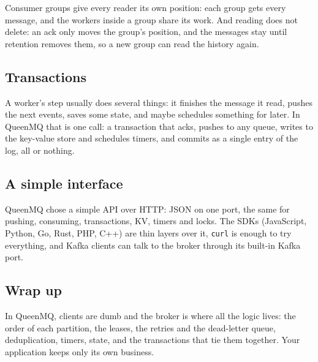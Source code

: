 
Consumer groups give every reader its own position: each group gets every message, and the
workers inside a group share its work. And reading does not delete: an ack only moves the group's
position, and the messages stay until retention removes them, so a new group can read the history
again.


\subsection{Transactions}

A worker's step usually does several things: it finishes the message it read, pushes the next
events, saves some state, and maybe schedules something for later. In QueenMQ that is one call: a
transaction that acks, pushes to any queue, writes to the key-value store and schedules timers, and
commits as a single entry of the log, all or nothing.



\subsection{A simple interface}

QueenMQ chose a simple API over HTTP: JSON on one port, the same for pushing, consuming,
transactions, KV, timers and locks. The SDKs (JavaScript, Python, Go, Rust, PHP, C++) are thin
layers over it, \texttt{curl} is enough to try everything, and Kafka clients can talk to the
broker through its built-in Kafka port.



\subsection{Wrap up}

In QueenMQ, clients are dumb and the broker is where all the logic lives: the order of each
partition, the leases, the retries and the dead-letter queue, deduplication, timers, state, and
the transactions that tie them together. Your application keeps only its own business.
